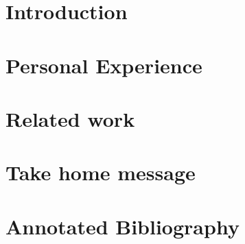 \documentclass[a4paper, 11pt]{article} %
\begin{document}
\section*{Introduction}





\section*{Personal Experience}


\section*{Related work}


\section*{Take home message}



\section*{Annotated Bibliography}







\end{document}
